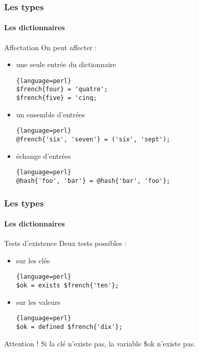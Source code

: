 \begin{frame}[fragile]
  \frametitle{Les types}
  \framesubtitle{Les dictionnaires}

  \begin{block}{Affectation}
    On peut affecter :
    \begin{itemize}
    \item une seule entrée du dictionnaire
      \begin{lstlisting}{language=perl}
$french{four} = 'quatre';
$french{five} = 'cinq;
      \end{lstlisting}
    \item un ensemble d'entrées
      \begin{lstlisting}{language=perl}
@french{'six', 'seven'} = ('six', 'sept');
      \end{lstlisting}
    \item échange d'entrées
      \begin{lstlisting}{language=perl}
@hash{'foo', 'bar'} = @hash{'bar', 'foo'};
      \end{lstlisting}
    \end{itemize}
  \end{block}

\end{frame}

\begin{frame}[fragile]
  \frametitle{Les types}
  \framesubtitle{Les dictionnaires}

  \begin{block}{Tests d'existence}
    Deux tests possibles :
    \begin{itemize}
    \item sur les clés
      \begin{lstlisting}{language=perl}
$ok = exists $french{'ten'};
      \end{lstlisting}
    \item sur les valeurs
      \begin{lstlisting}{language=perl}
$ok = defined $french{'dix'};
      \end{lstlisting}
    \end{itemize}
  \end{block}

  \begin{alertblock}{Attention !}
    Si la clé n'existe pas, la variable \$ok n'existe pas.
  \end{alertblock}

\end{frame}

